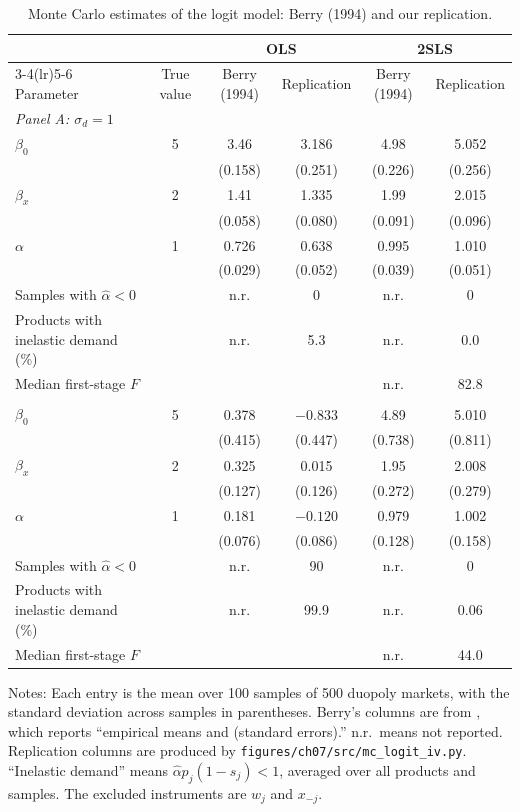 \begin{table}[htbp]
\centering
\caption{Monte Carlo estimates of the logit model: Berry (1994) and our replication.}
\label{tab:07-mc-logit}
\footnotesize
\begin{tabular}{lccccc}
\toprule
 & & \multicolumn{2}{c}{OLS} & \multicolumn{2}{c}{2SLS} \\
\cmidrule(lr){3-4}\cmidrule(lr){5-6}
Parameter & True value & Berry (1994) & Replication & Berry (1994) & Replication \\
\midrule
\multicolumn{6}{l}{\textit{Panel A: $\sigma_d = 1$}} \\
$\beta_0$ & 5 & 3.46 & 3.186 & 4.98 & 5.052 \\
 & & (0.158) & (0.251) & (0.226) & (0.256) \\
$\beta_x$ & 2 & 1.41 & 1.335 & 1.99 & 2.015 \\
 & & (0.058) & (0.080) & (0.091) & (0.096) \\
$\alpha$ & 1 & 0.726 & 0.638 & 0.995 & 1.010 \\
 & & (0.029) & (0.052) & (0.039) & (0.051) \\
Samples with $\hat\alpha < 0$ & & n.r. & 0 & n.r. & 0 \\
Products with inelastic demand (\%) & & n.r. & 5.3 & n.r. & 0.0 \\
Median first-stage $F$ & & & & n.r. & 82.8 \\
\addlinespace
\multicolumn{6}{l}{\textit{Panel B: $\sigma_d = 3$}} \\
$\beta_0$ & 5 & 0.378 & $-0.833$ & 4.89 & 5.010 \\
 & & (0.415) & (0.447) & (0.738) & (0.811) \\
$\beta_x$ & 2 & 0.325 & 0.015 & 1.95 & 2.008 \\
 & & (0.127) & (0.126) & (0.272) & (0.279) \\
$\alpha$ & 1 & 0.181 & $-0.120$ & 0.979 & 1.002 \\
 & & (0.076) & (0.086) & (0.128) & (0.158) \\
Samples with $\hat\alpha < 0$ & & n.r. & 90 & n.r. & 0 \\
Products with inelastic demand (\%) & & n.r. & 99.9 & n.r. & 0.06 \\
Median first-stage $F$ & & & & n.r. & 44.0 \\
\bottomrule
\end{tabular}
\par\smallskip
\parbox{\linewidth}{\footnotesize Notes: Each entry is the mean over 100 samples of 500 duopoly markets, with the
standard deviation across samples in parentheses. Berry's columns are from \citet[Table~1, p.~257]{Berry1994}, which
reports ``empirical means and (standard errors).'' n.r.\ means not reported. Replication columns are produced by
\texttt{figures/ch07/src/mc\_logit\_iv.py}. ``Inelastic demand'' means $\hat\alpha p_j (1 - s_j) < 1$, averaged over
all products and samples. The excluded instruments are $w_j$ and $x_{-j}$.}
\end{table}

